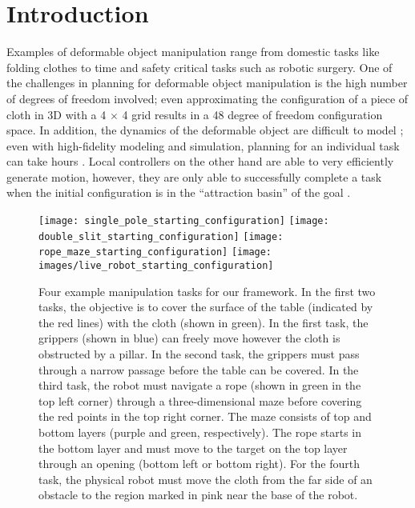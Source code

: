 \section{Introduction}

Examples of deformable object manipulation range from domestic tasks like folding clothes to time and safety critical tasks such as robotic surgery. One of the challenges in planning for deformable object manipulation is the high number of degrees of freedom involved; even approximating the configuration of a piece of cloth in 3D with a 4 $\times$ 4 grid results in a 48 degree of freedom configuration space. In addition, the dynamics of the deformable object are difficult to model \citep{Essahbi2012}; even with high-fidelity modeling and simulation, planning for an individual task can take hours \citep{Bai2016}. Local controllers on the other hand are able to very efficiently generate motion, however, they are only able to successfully complete a task when the initial configuration is in the ``attraction basin'' of the goal \citep{Berenson2013,McConachie2018}.

\begin{figure*}[t]
    \centering
    \texttt{[image: single\_pole\_starting\_configuration]}
    \hfill
    \texttt{[image: double\_slit\_starting\_configuration]}
    \hfill
    \texttt{[image: rope\_maze\_starting\_configuration]}
    \hfill
    \texttt{[image: images/live\_robot\_starting\_configuration]}
    \caption{Four example manipulation tasks for our framework. In the first two tasks, the objective is to cover the surface of the table (indicated by the red lines) with the cloth (shown in green). In the first task, the grippers (shown in blue) can freely move however the cloth is obstructed by a pillar. In the second task, the grippers must pass through a narrow passage before the table can be covered. In the third task, the robot must navigate a rope (shown in green in the top left corner) through a three-dimensional maze before covering the red points in the top right corner. The maze consists of top and bottom layers (purple and green, respectively). The rope starts in the bottom layer and must move to the target on the top layer through an opening (bottom left or bottom right). For the fourth task, the physical robot must move the cloth from the far side of an obstacle to the region marked in pink near the base of the robot.}
    \label{fig:example_tasks}
\end{figure*}

